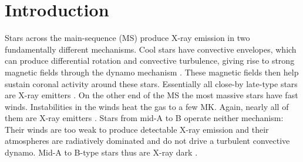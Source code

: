 \documentclass[preprint2]{aastex631}
\begin{document}


\section{Introduction} \label{sec:intro}
Stars across the main-sequence (MS) produce X-ray emission in two fundamentally different mechanisms. Cool stars have convective envelopes, 
which can produce differential rotation and convective turbulence, giving rise to strong magnetic fields through the dynamo mechanism \citep{2017LRSP...14....4B}. These magnetic fields then help sustain coronal activity around these stars.
Essentially all close-by late-type stars are X-ray emitters \citep{2004A&A...417..651S}. On the other end of the MS the most massive stars have fast winds. Instabilities in the winds heat the gas to a few MK. Again, nearly all of them are X-ray emitters \citep{1996A&AS..118..481B,1997A&A...322..167B}. Stars from mid-A to B operate neither mechanism: Their winds are too weak to produce detectable X-ray emission and their atmospheres are radiatively dominated and do not drive a turbulent convective dynamo. Mid-A to B-type stars thus are X-ray dark \citep{1997A&A...318..215S}.
\end{document}

